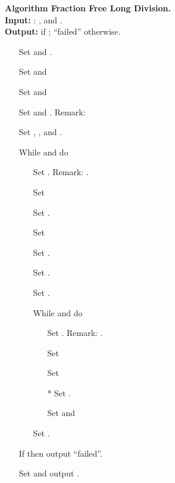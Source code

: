 \documentclass[10pt]{article}
\begin{document}
\noindent
{\bf Algorithm Fraction Free Long Division.} \\
{\bf Input:}  :  , and
       . \\
{\bf Output:}  if ; ``failed'' otherwise.
\begin{itemize}
\item[]    Set   and .
\vspace*{-2mm}
\item[]    Set  and 
\vspace*{-2mm}
\item[]    Set  and 
\vspace*{-2mm}
\item[]    Set  and . Remark: 
\vspace*{-2mm}
\item[]    Set , , and .
\vspace*{-2mm}
\item[]    While  and  do
\vspace*{-2mm}
\begin{itemize}
\item[]        Set .  Remark: .
\vspace*{-1mm}
\item[]        Set 
\vspace*{-1mm}
\item[]        Set .
\vspace*{-1mm}
\item[]        Set 
\vspace*{-1mm}
\item[]        Set .
\vspace*{-1mm}
\item[]        Set .
\vspace*{-1mm}
\item[]        Set .
\vspace*{-1mm}
\item[]        While  and  do
\vspace*{-0mm}
\begin{itemize}
\item[]            Set .  Remark: .
\vspace*{-0mm}
\item[]            Set 
\vspace*{-0mm}
\item[]            Set 
\vspace*{-0mm}
\item[*]            Set .
\vspace*{-0mm}
\item[]            Set  and 
\vspace*{-0mm}
\end{itemize}
\item[]        Set .
\vspace*{-1mm}
\end{itemize}
\item[]    If  then output ``failed''.
\vspace*{-2mm}
\item[]
Set  and output .
\end{itemize}
\end{document}
